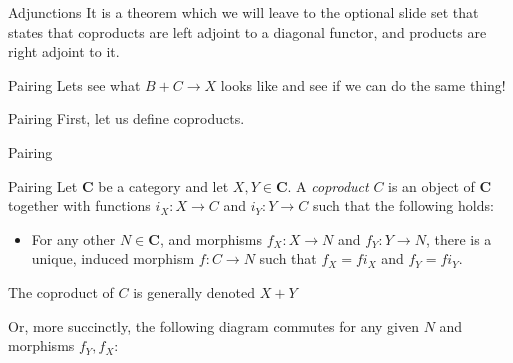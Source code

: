 \documentclass[tikz]{beamer}
\theoremstyle{definition}
\newcommand{\cat}[1]{\mathbf{#1}}
\begin{document}
\begin{frame}{Adjunctions}
   It is a theorem which we will leave to the optional slide set that states that coproducts are left adjoint to a diagonal functor, and products are right adjoint to it. 
\end{frame}

\begin{frame}{Pairing}
    Lets see what $B + C \to X$ looks like and see if we can do the same thing!
\end{frame}{}

\begin{frame}{Pairing}
    First, let us define coproducts. 
\end{frame}{}

\begin{frame}{Pairing}
    \begin{definition}{Pairing}
        Let $\cat{C}$ be a category and let $X, Y \in \cat{C}$. A \textit{coproduct} $C$ is an object of $\cat{C}$ together with functions $i_X : X \to C$ and $i_Y: Y \to C$ such that the following holds: 
        
        \begin{itemize}
            \item For any other $N \in \cat{C}$, and morphisms $f_X: X \to N$ and $f_Y: Y \to N$, there is a unique, induced morphism $f: C \to N$ such that $f_X = fi_X$ and $f_Y = fi_Y$.
        \end{itemize}{}
    \end{definition}{}
    
    The coproduct of $C$ is generally denoted $X + Y$
\end{frame}{}

\begin{frame}[fragile]
    Or, more succinctly, the following diagram commutes for any given $N$ and morphisms $f_Y, f_X$: 
    
\begin{center}
    {}
\end{center}{}

\end{frame}
\end{document}
